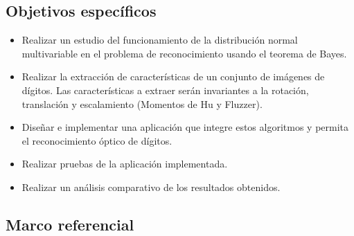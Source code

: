 \documentclass[a4paper, 11pt, oneside]{article}
\begin{document}
	\subsection{Objetivos específicos}
	\begin{itemize}
	\item Realizar un estudio del funcionamiento de la distribución normal multivariable en el problema de reconocimiento usando
	el teorema de Bayes.
	\item Realizar la extracción de características de un conjunto de imágenes de dígitos. Las características a extraer serán
	invariantes a la rotación, translación y escalamiento (Momentos de Hu y Fluzzer).
	\item Diseñar e implementar una aplicación que integre estos algoritmos y permita el reconocimiento óptico de dígitos.
	\item Realizar pruebas de la aplicación implementada.
	\item Realizar un análisis comparativo de los resultados obtenidos.
	\end{itemize}
	\clearpage
	
	\begin{center}
	\section{Marco referencial}
	\end{center}
	
\end{document}
